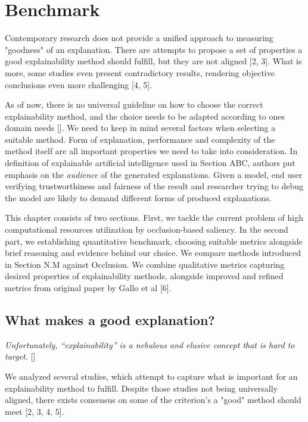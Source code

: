 \chapter{Benchmark}

Contemporary research does not provide a unified approach to measuring "goodness" of an explanation. There are attempts to propose a set of properties a good explainability method should fulfill, but they are not aligned [2, 3]. What is more, some studies even present contradictory results, rendering objective conclusions even more challenging [4, 5].

As of now, there is no universal guideline on how to choose the correct explainability method, and the choice needs to be adapted according to ones domain needs []. We need to keep in mind several factors when selecting a suitable method. Form of explanation, performance and complexity of the method itself are all important properties we need to take into consideration. In definition of explainable artificial intelligence used in Section ABC, authors put emphasis on the \emph{audience} of the generated explanations. Given a model, end user verifying trustworthiness and fairness of the result and researcher trying to debug the model are likely to demand different forms of produced explanations. 

This chapter consists of two sections. First, we tackle the current problem of high computational resources utilization by occlusion-based saliency. In the second part, we establishing quantitative benchmark, choosing suitable metrics alongside brief reasoning and evidence behind our choice. We compare methods introduced in Section N.M against Occlusion. We combine qualitative metrics capturing desired properties of explainability methods, alongside improved and refined metrics from original paper by Gallo et al [6].

\section{What makes a good explanation?}

\emph{Unfortunately, “explainability” is a nebulous and elusive concept that is hard to target.} []
\newline

\noindent
We analyzed several studies, which attempt to capture what is important for an explainability method to fulfill. Despite those studies not being universally aligned, there exists consensus on some of the criterion's a "good" method should meet [2, 3, 4, 5]. 

